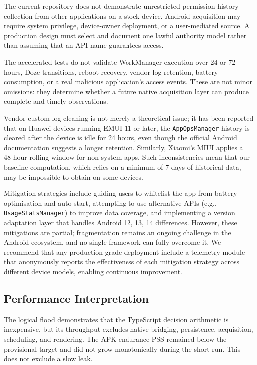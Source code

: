 The current repository does not demonstrate unrestricted permission-history collection from other applications on a stock device. Android acquisition may require system privilege, device-owner deployment, or a user-mediated source. A production design must select and document one lawful authority model rather than assuming that an API name guarantees access.

The accelerated tests do not validate WorkManager execution over 24 or 72 hours, Doze transitions, reboot recovery, vendor log retention, battery consumption, or a real malicious application's access events. These are not minor omissions: they determine whether a future native acquisition layer can produce complete and timely observations.

Vendor custom log cleaning is not merely a theoretical issue; it has been reported that on Huawei devices running EMUI 11 or later, the \texttt{AppOpsManager} history is cleared after the device is idle for 24 hours, even though the official Android documentation suggests a longer retention. Similarly, Xiaomi's MIUI applies a 48‑hour rolling window for non‑system apps. Such inconsistencies mean that our baseline computation, which relies on a minimum of 7 days of historical data, may be impossible to obtain on some devices.

Mitigation strategies include guiding users to whitelist the app from battery optimisation and auto‑start, attempting to use alternative APIs (e.g., \texttt{UsageStatsManager}) to improve data coverage, and implementing a version adaptation layer that handles Android 12, 13, 14 differences. However, these mitigations are partial; fragmentation remains an ongoing challenge in the Android ecosystem, and no single framework can fully overcome it. We recommend that any production‑grade deployment include a telemetry module that anonymously reports the effectiveness of each mitigation strategy across different device models, enabling continuous improvement.

\subsection{Performance Interpretation}

The logical flood demonstrates that the TypeScript decision arithmetic is inexpensive, but its throughput excludes native bridging, persistence, acquisition, scheduling, and rendering. The APK endurance PSS remained below the provisional target and did not grow monotonically during the short run. This does not exclude a slow leak.

